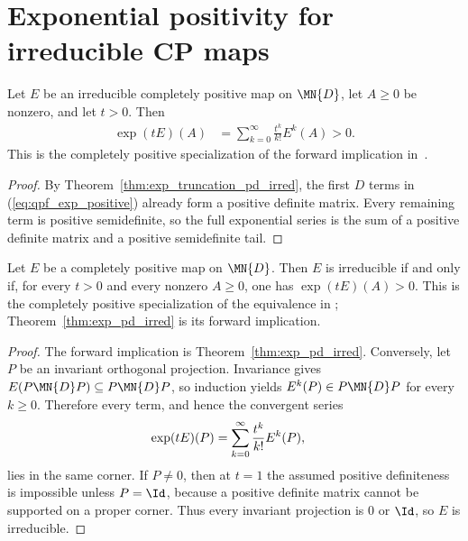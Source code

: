 \section{Exponential positivity for irreducible CP maps}


\begin{theorem}
    \label{thm:exp_pd_irred}
    \leanok
    Let $E$ be an irreducible completely positive map on $\MN{D}$,
    let $A \ge 0$ be nonzero, and let $t > 0$.
    Then
    \begin{align}
        \exp(tE)(A)
         & = \sum_{k=0}^{\infty}\frac{t^k}{k!}E^k(A)>0.
        \label{eq:qpf_exp_positive}
    \end{align}
    This is the completely positive specialization of the forward implication
    in~\cite[Theorem~6.2(3)]{Wolf2012Quantum}.
\end{theorem}

\begin{proof}
    \leanok
    By Theorem~\ref{thm:exp_truncation_pd_irred}, the first $D$ terms in
    (\ref{eq:qpf_exp_positive}) already form a positive definite matrix.
    Every remaining term is positive semidefinite, so the full exponential
    series is the sum of a positive definite matrix and a positive
    semidefinite tail.
\end{proof}

\begin{theorem}
    \label{thm:wolf_6_2_item_3}
    \leanok
    Let $E$ be a completely positive map on $\MN{D}$. Then $E$ is
    irreducible if and only if, for every $t>0$ and every nonzero
    $A\geq0$, one has $\exp(tE)(A)>0$.
    This is the completely positive specialization of the equivalence in
    \cite[Theorem~6.2(3)]{Wolf2012Quantum};
    Theorem~\ref{thm:exp_pd_irred} is its forward implication.
\end{theorem}

\begin{proof}\leanok
    The forward implication is Theorem~\ref{thm:exp_pd_irred}. Conversely,
    let $P$ be an invariant orthogonal projection. Invariance gives
    $E(P\MN{D}P)\subseteq P\MN{D}P$, so induction yields
    $E^k(P)\in P\MN{D}P$ for every $k\geq0$. Therefore every term, and hence
    the convergent series
    \begin{align}
        \exp(tE)(P)
         & =\sum_{k=0}^{\infty}\frac{t^k}{k!}E^k(P),
        \notag
    \end{align}
    lies in the same corner. If $P\neq0$, then at $t=1$ the assumed positive
    definiteness is impossible unless $P=\Id$, because a positive definite
    matrix cannot be supported on a proper corner. Thus every invariant
    projection is $0$ or $\Id$, so $E$ is irreducible.
\end{proof}

